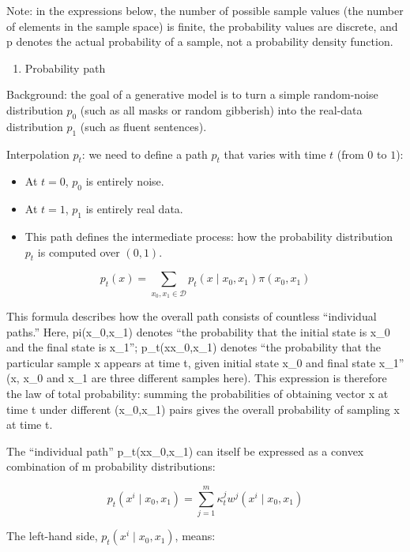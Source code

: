 Note: in the expressions below, the number of possible sample values (the number of elements in the sample space) is finite, the probability values are discrete, and p denotes the actual probability of a sample, not a probability density function.

\begin{enumerate}
\def\labelenumi{\arabic{enumi}.}
\tightlist
\item
  Probability path
\end{enumerate}

Background: the goal of a generative model is to turn a simple random-noise distribution \(p_0\) (such as all masks or random gibberish) into the real-data distribution \(p_1\) (such as fluent sentences).

Interpolation \(p_t\): we need to define a path \(p_t\) that varies with time \(t\) (from \(0\) to \(1\)):

\begin{itemize}
\tightlist
\item
  At \(t=0\), \(p_0\) is entirely noise.
\item
  At \(t=1\), \(p_1\) is entirely real data.
\item
  This path defines the intermediate process: how the probability distribution \(p_t\) is computed over \((0,1)\).
\end{itemize}

\[
p_t(x)=\sum_{x_0,x_1\in\mathcal{D}}p_t(x\mid x_0,x_1)\pi(x_0,x_1)
\]

This formula describes how the overall path consists of countless ``individual paths.''
Here, pi(x\_0,x\_1) denotes ``the probability that the initial state is x\_0 and the final state is x\_1''; p\_t(x\textbar x\_0,x\_1) denotes ``the probability that the particular sample x appears at time t, given initial state x\_0 and final state x\_1'' (x, x\_0 and x\_1 are three different samples here). This expression is therefore the law of total probability: summing the probabilities of obtaining vector x at time t under different (x\_0,x\_1) pairs gives the overall probability of sampling x at time t.

The ``individual path'' p\_t(x\textbar x\_0,x\_1) can itself be expressed as a convex combination of m probability distributions:

\[
p_t(x^i\mid x_0,x_1)=\sum_{j=1}^m\kappa_t^j w^j(x^i\mid x_0,x_1)
\]

The left-hand side, \(p_t(x^i\mid x_0,x_1)\), means:

